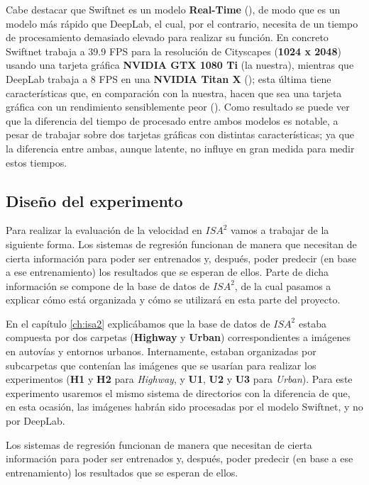 Cabe destacar que Swiftnet es un modelo \textbf{Real-Time} (\cite{swiftnet}), de modo que es un modelo más rápido que DeepLab, el cual, por el contrario, necesita de un tiempo de procesamiento demasiado elevado para realizar su función. En concreto Swiftnet trabaja a 39.9 \ac{FPS} para la resolución de Cityscapes (\textbf{1024 x 2048}) usando una tarjeta gráfica \textbf{NVIDIA GTX 1080 Ti} (la nuestra), mientras que DeepLab trabaja a 8 \ac{FPS} en una \textbf{NVIDIA Titan X} (\cite{deeplab}); esta última tiene características que, en comparación con la nuestra, hacen que sea una tarjeta gráfica con un rendimiento sensiblemente peor (\cite{gtx_titan}). Como resultado se puede ver que la diferencia del tiempo de procesado entre ambos modelos es notable, a pesar de trabajar sobre dos tarjetas gráficas con distintas características; ya que la diferencia entre ambas, aunque latente, no influye en gran medida para medir estos tiempos. %

\subsection{Diseño del experimento}

Para realizar la evaluación de la velocidad en $ISA^{2}$ vamos a trabajar de la siguiente forma. Los sistemas de regresión funcionan de manera que necesitan de cierta información para poder ser entrenados y, después, poder predecir (en base a ese entrenamiento) los resultados que se esperan de ellos. Parte de dicha información se compone de la base de datos de $ISA^{2}$, de la cual pasamos a explicar cómo está organizada y cómo se utilizará en esta parte del proyecto.

En el capítulo \ref{ch:isa2} explicábamos que la base de datos de $ISA^{2}$ estaba compuesta por dos carpetas (\textbf{Highway} y \textbf{Urban}) correspondientes a imágenes en autovías y entornos urbanos. Internamente, estaban organizadas por subcarpetas que contenían las imágenes que se usarían para realizar los experimentos (\textbf{H1} y \textbf{H2} para \textit{Highway}, y \textbf{U1}, \textbf{U2} y \textbf{U3} para \textit{Urban}). Para este experimento usaremos el mismo sistema de directorios con la diferencia de que, en esta ocasión, las imágenes habrán sido procesadas por el modelo Swiftnet, y no por DeepLab.

Los sistemas de regresión funcionan de manera que necesitan de cierta información para poder ser entrenados y, después, poder predecir (en base a ese entrenamiento) los resultados que se esperan de ellos.

